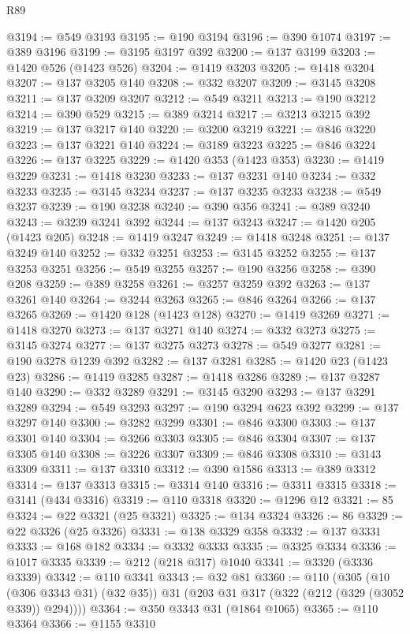 \begin{lexlean}{R89}
\begin{coremodule}
@3194 := @549 @3193
@3195 := @190 @3194
@3196 := @390 @1074
@3197 := @389 @3196
@3199 := @3195 @3197 @392
@3200 := @137 @3199
@3203 := @1420 @526 (@1423 @526)
@3204 := @1419 @3203
@3205 := @1418 @3204
@3207 := @137 @3205 @140
@3208 := @332 @3207
@3209 := @3145 @3208
@3211 := @137 @3209 @3207
@3212 := @549 @3211
@3213 := @190 @3212
@3214 := @390 @529
@3215 := @389 @3214
@3217 := @3213 @3215 @392
@3219 := @137 @3217 @140
@3220 := @3200 @3219
@3221 := @846 @3220
@3223 := @137 @3221 @140
@3224 := @3189 @3223
@3225 := @846 @3224
@3226 := @137 @3225
@3229 := @1420 @353 (@1423 @353)
@3230 := @1419 @3229
@3231 := @1418 @3230
@3233 := @137 @3231 @140
@3234 := @332 @3233
@3235 := @3145 @3234
@3237 := @137 @3235 @3233
@3238 := @549 @3237
@3239 := @190 @3238
@3240 := @390 @356
@3241 := @389 @3240
@3243 := @3239 @3241 @392
@3244 := @137 @3243
@3247 := @1420 @205 (@1423 @205)
@3248 := @1419 @3247
@3249 := @1418 @3248
@3251 := @137 @3249 @140
@3252 := @332 @3251
@3253 := @3145 @3252
@3255 := @137 @3253 @3251
@3256 := @549 @3255
@3257 := @190 @3256
@3258 := @390 @208
@3259 := @389 @3258
@3261 := @3257 @3259 @392
@3263 := @137 @3261 @140
@3264 := @3244 @3263
@3265 := @846 @3264
@3266 := @137 @3265
@3269 := @1420 @128 (@1423 @128)
@3270 := @1419 @3269
@3271 := @1418 @3270
@3273 := @137 @3271 @140
@3274 := @332 @3273
@3275 := @3145 @3274
@3277 := @137 @3275 @3273
@3278 := @549 @3277
@3281 := @190 @3278 @1239 @392
@3282 := @137 @3281
@3285 := @1420 @23 (@1423 @23)
@3286 := @1419 @3285
@3287 := @1418 @3286
@3289 := @137 @3287 @140
@3290 := @332 @3289
@3291 := @3145 @3290
@3293 := @137 @3291 @3289
@3294 := @549 @3293
@3297 := @190 @3294 @623 @392
@3299 := @137 @3297 @140
@3300 := @3282 @3299
@3301 := @846 @3300
@3303 := @137 @3301 @140
@3304 := @3266 @3303
@3305 := @846 @3304
@3307 := @137 @3305 @140
@3308 := @3226 @3307
@3309 := @846 @3308
@3310 := @3143 @3309
@3311 := @137 @3310
@3312 := @390 @1586
@3313 := @389 @3312
@3314 := @137 @3313
@3315 := @3314 @140
@3316 := @3311 @3315
@3318 := @3141 (@434 @3316)
@3319 := @110 @3318
@3320 := @1296 @12
@3321 := 85
@3324 := @22 @3321 (@25 @3321)
@3325 := @134 @3324
@3326 := 86
@3329 := @22 @3326 (@25 @3326)
@3331 := @138 @3329 @358
@3332 := @137 @3331
@3333 := @168 @182
@3334 := @3332 @3333
@3335 := @3325 @3334
@3336 := @1017 @3335
@3339 := @212 (@218 @317) @1040
@3341 := @3320 (@3336 @3339)
@3342 := @110 @3341
@3343 := @32 @81
@3360 := @110
    (@305
      (@10 (@306 @3343 @31) (@32 @35))
      @31
      (@203 @31 @317 (@322 (@212 (@329 (@3052 @339)) @294))))
@3364 := @350 @3343 @31 (@1864 @1065)
@3365 := @110 @3364
@3366 := @1155 @3310

\end{coremodule}
\end{lexlean}
